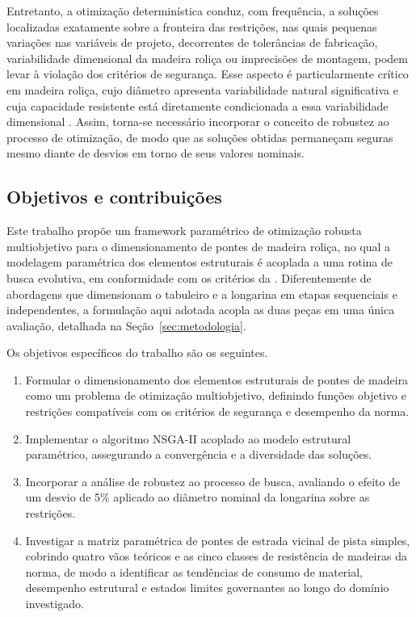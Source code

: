 Entretanto, a otimização determinística conduz, com frequência, a soluções localizadas exatamente sobre a fronteira das restrições, nas quais pequenas variações nas variáveis de projeto, decorrentes de tolerâncias de fabricação, variabilidade dimensional da madeira roliça ou imprecisões de montagem, podem levar à violação dos critérios de segurança.
Esse aspecto é particularmente crítico em madeira roliça, cujo diâmetro apresenta variabilidade natural significativa e cuja capacidade resistente está diretamente condicionada a essa variabilidade dimensional \parencite{Morgado2017}.
Assim, torna-se necessário incorporar o conceito de robustez ao processo de otimização, de modo que as soluções obtidas permaneçam seguras mesmo diante de desvios em torno de seus valores nominais.

\subsection{Objetivos e contribuições}\label{sec:objetivos_contribuicoes}

Este trabalho propõe um framework paramétrico de otimização robusta multiobjetivo para o dimensionamento de pontes de madeira roliça, no qual a modelagem paramétrica dos elementos estruturais é acoplada a uma rotina de busca evolutiva, em conformidade com os critérios da \textcite{NBR7190-1:2022}.
Diferentemente de abordagens que dimensionam o tabuleiro e a longarina em etapas sequenciais e independentes, a formulação aqui adotada acopla as duas peças em uma única avaliação, detalhada na Seção~\ref{sec:metodologia}.

Os objetivos específicos do trabalho são os seguintes.
\begin{enumerate}[label=(\roman*)]
    \item Formular o dimensionamento dos elementos estruturais de pontes de madeira como um problema de otimização multiobjetivo, definindo funções objetivo e restrições compatíveis com os critérios de segurança e desempenho da norma.
    \item Implementar o algoritmo NSGA-II acoplado ao modelo estrutural paramétrico, assegurando a convergência e a diversidade das soluções.
    \item Incorporar a análise de robustez ao processo de busca, avaliando o efeito de um desvio de 5\% aplicado ao diâmetro nominal da longarina sobre as restrições.
    \item Investigar a matriz paramétrica de pontes de estrada vicinal de pista simples, cobrindo quatro vãos teóricos e as cinco classes de resistência de madeiras da norma, de modo a identificar as tendências de consumo de material, desempenho estrutural e estados limites governantes ao longo do domínio investigado.
\end{enumerate}

